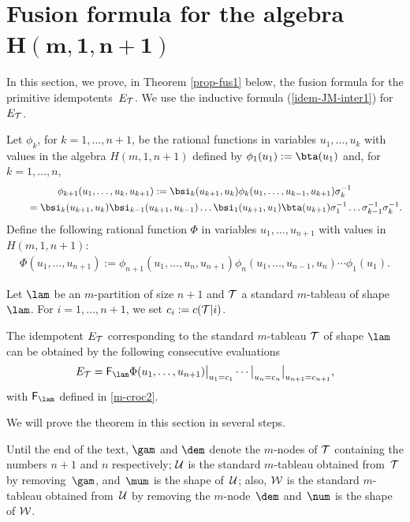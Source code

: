 \section[Fusion formula for the algebra $H(m,1,n+1)$]{Fusion formula for the algebra $\boldsymbol{H(m,1,n+1)}$}\label{sec-fus}

In this section, we prove, in Theorem \ref{prop-fus1} below, the fusion formula for the primitive idempo\-tents~$E_{{\cal{T}}}$. We use the inductive formula (\ref{idem-JM-inter1}) for $E_{{\cal{T}}}$.


Let $\phi_{k}$, for $k=1,\dots,n+1$, be the rational functions in variables $u_1,\dots,u_k$ with values in the algebra $H(m,1,n+1)$ def\/ined by
$\phi_{1}(u_1):=\bta(u_1)$ and, for $k=1,\dots,n$,
 \begin{gather*}\phi_{k+1}(u_1,\dots,u_k,u_{k+1}):=
\bsi_k(u_{k+1},u_k)\phi_{k}(u_1,\dots,u_{k-1},u_{k+1})\sigma_k^{-1}\\
\qquad {} =   \bsi_{k}(u_{k+1},u_k)\bsi_{k-1}(u_{k+1},u_{k-1})\dots \bsi_{1}(u_{k+1},u_1)\bta(u_{k+1})\sigma_1^{-1}\dots \sigma_{k-1}^{-1}\sigma_k^{-1}  . \end{gather*}
Def\/ine the following rational function $\Phi$ in variables $u_1,\dots,u_{n+1}$ with values in $H(m,1,n+1)$:
\begin{gather*}%
\Phi(u_1,\dots,u_{n+1}):=
\phi_{n+1}(u_1,\dots,u_n,u_{n+1})
\phi_{n}(u_1,\dots,u_{n-1},u_{n}) \cdots \phi_{1}(u_1) .
\end{gather*}


Let $\lam$ be an $m$-partition of size $n+1$ and ${\cal{T}}$ a standard $m$-tableau of shape $\lam$. For $i=1,\dots,n+1$, we set $c_i:=c({\cal{T}}|i)$.

\begin{Theorem}\label{prop-fus1}
The idempotent $E_{{\cal{T}}}$ corresponding to the standard $m$-tableau ${\cal{T}}$ of shape $\lam$ can be obtained by the following consecutive evaluations
\begin{gather*}%
E_{{\cal{T}}}=\mathsf{F}_{\lam}\Phi(u_1,\dots,u_{n+1})\bigr\rvert_{u_1=c_1}\cdots\bigr\rvert_{u_n=c_n}\bigr\rvert_{u_{n+1}=c_{n+1}}  ,
\end{gather*}
with $\mathsf{F}_{\lam}$ defined in \eqref{m-croc2}.
\end{Theorem}

We will prove the theorem in this section in several steps.


Until the end of the text, $\gam$ and $\dem$
denote the $m$-nodes of $\cal{T}$ containing the numbers $n+1$ and $n$  respectively; ${\cal{U}}$ is the standard $m$-tableau obtained from~${\cal{T}}$ by removing~$\gam$, and~$\mum$ is the shape of~${\cal{U}}$; also, ${\cal{W}}$ is the standard $m$-tableau obtained from~${\cal{U}}$ by removing the $m$-node~$\dem$ and~$\num$ is the shape of ${\cal{W}}$.

